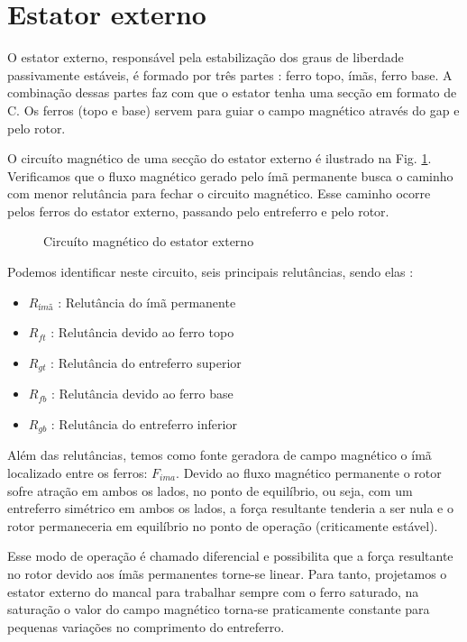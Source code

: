 \section{Estator externo}\label{cap:mancal:estator:externo}

O estator externo, responsável pela estabilização dos graus de liberdade passivamente estáveis, é formado por três partes : ferro topo, ímãs, ferro base. A combinação dessas partes faz com que o estator tenha uma secção em formato de C. Os ferros (topo e base) servem para guiar o campo magnético através do gap e pelo rotor. 

O circuíto magnético de uma secção do estator externo é ilustrado na Fig. \ref{Fig:mancal:circuito:passivo}. Verificamos que o fluxo magnético gerado pelo ímã permanente busca o caminho com menor relutância para fechar o circuito magnético. Esse caminho ocorre pelos ferros do estator externo, passando pelo entreferro e  pelo rotor.

\begin{figure}[!ht]
	\centering
	\def\svgwidth{1\columnwidth}
	
	\caption{Circuíto magnético do estator externo}
	\label{Fig:mancal:circuito:passivo}
\end{figure}

Podemos identificar neste circuito, seis principais relutâncias, sendo elas :

\begin{itemize}
	\item $R_{ímã}$ : Relutância do ímã permanente
	\item $R_{ft}$ : Relutância devido ao ferro topo
	\item $R_{gt}$ : Relutância do entreferro superior
	\item $R_{fb}$ : Relutância devido ao ferro base
	\item $R_{gb}$ : Relutância do entreferro inferior	
\end{itemize}

Além das relutâncias, temos como fonte geradora de campo magnético o ímã localizado entre os ferros: $F_{ima}$. Devido ao fluxo magnético permanente o rotor sofre atração em ambos os lados, no ponto de equilíbrio, ou seja, com um entreferro simétrico em ambos os lados, a força resultante tenderia a ser nula e o rotor permaneceria em equilíbrio no ponto de operação (criticamente estável). 

Esse modo de operação é chamado diferencial e possibilita que a força resultante no rotor devido aos ímãs permanentes torne-se linear. Para tanto, projetamos o estator externo do mancal para trabalhar sempre com o ferro saturado, na saturação o valor do campo magnético torna-se praticamente constante para pequenas variações no comprimento do entreferro.

